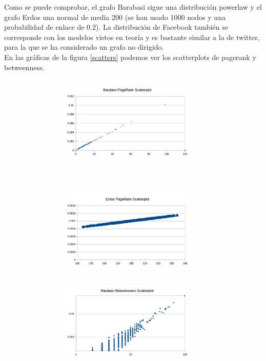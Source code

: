 \documentclass[spanish]{assignment}
\begin{document}
	Como se puede comprobar, el grafo Barabasi sigue una distribución powerlaw y el grafo Erdos una normal de media 200 
	(se han usado 1000 nodos y una probabilidad de enlace de 0.2). La distribución de Facebook también se corresponde con 
	los modelos vistos en teoría y es bastante similar a la de twitter, para la que se ha considerado un grafo no dirigido.\\
	
	En las gráficas de la figura \ref{scatters} podemos ver los scatterplots de pagerank y betweenness.\\
	
		\begin{figure}[ht!]
			\begin{subfigure}[t!]{0.5\textwidth}
				\begin{subfigure}[t!]{\textwidth}
					\centering
					\includegraphics[width=180pt, height=120pt]{img/barabasi_pr_s.png}
				\end{subfigure}\\
				\begin{subfigure}[t!]{\textwidth}
					\centering
					\includegraphics[width=180pt, height=120pt]{img/erdos_pr_s.png}
				\end{subfigure}
			\end{subfigure}
			\begin{subfigure}[t!]{0.5\textwidth}
				\begin{subfigure}[t!]{\textwidth}
					\centering
					\includegraphics[width=180pt, height=120pt]{img/barabasi_b_s.png}

\end{subfigure}
\end{subfigure}
\end{figure}
\end{document}
